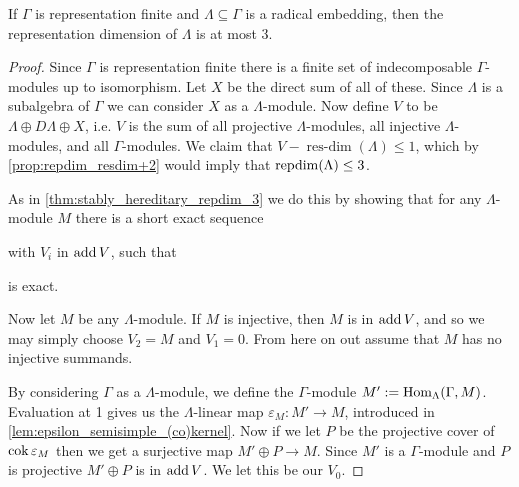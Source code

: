 \begin{theorem}
	If $\Gamma$ is representation finite and $\Lambda \subseteq \Gamma$ is a radical embedding, then the representation dimension of $\Lambda$ is at most 3.
	\begin{proof}
		Since $\Gamma$ is representation finite there is a finite set of indecomposable $\Gamma$-modules up to isomorphism. Let $X$ be the direct sum of all of these. Since $\Lambda$ is a subalgebra of $\Gamma$ we can consider $X$ as a $\Lambda$-module. Now define $V$ to be $\Lambda \oplus D\Lambda \oplus X$, i.e. $V$ is the sum of all projective $\Lambda$-modules, all injective $\Lambda$-modules, and all $\Gamma$-modules. We claim that $V-\operatorname{res-dim}(\Lambda) \leq 1$, which by \cref{prop:repdim_resdim+2} would imply that $\operatorname{repdim}(\Lambda) \leq 3$.
		
		As in \cref{thm:stably_hereditary_repdim_3} we do this by showing that for any  $\Lambda$-module $M$ there is a short exact sequence
		\begin{center}
		\end{center}
		with $V_i$ in $\operatorname{add} V$, such that 
		\begin{center}
		\end{center}
		is exact. 
		
		Now let $M$ be any $\Lambda$-module. If $M$ is injective, then $M$ is in $\operatorname{add} V$, and so we may simply choose $V_2 = M$ and $V_1=0$. From here on out assume that $M$ has no injective summands. 
		
		By considering $\Gamma$ as a $\Lambda$-module, we define the $\Gamma$-module $M' := \operatorname{Hom}_\Lambda(\Gamma, M)$. Evaluation at 1 gives us the $\Lambda$-linear map $\varepsilon_M \colon M' \to M$, introduced in \cref{lem:epsilon_semisimple_(co)kernel}. Now if we let $P$ be the projective cover of $\operatorname{cok} \varepsilon_M$ then we get a surjective map $M' \oplus P \to M$. Since $M'$ is a $\Gamma$-module and $P$ is projective $M'\oplus P$ is in $\operatorname{add} V$. We let this be our $V_0$.
		

\end{proof}
\end{theorem}
